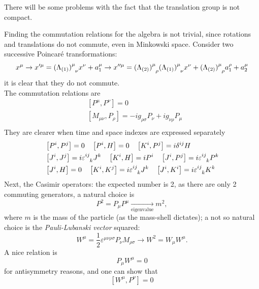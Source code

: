 There will be some problems with the fact that the translation group is not
compact.

Finding the commutation relations for the algebra is not trivial, since rotations
and translations do not commute, even in Minkowski space. Consider two
successive Poincaré transformations:
$$x^\mu\rightarrow x'^\mu={(\Lambda_{(1)})}\indices{^\mu_\nu}x^\nu+a_1^\mu\rightarrow
 x''^\mu={(\Lambda_{(2)})}\indices{^\mu_\rho}{(\Lambda_{(1)})}\indices{^\mu_\nu}
 x^\nu+ {(\Lambda_{(2)})}\indices{^\mu_\rho}a_1^\rho+a_2^\mu$$
it is clear that they do not commute.\\
The commutation relations are
\begin{align*}
&\left[P^\mu,P^\nu\right]=0\\
&\left[M_{\mu\nu},P_\rho\right] = -ig_{\rho\sigma}P_\nu+ig_{\nu\rho}P_\mu\\
\end{align*}
They are clearer when time and space indexes are expressed separately
\begin{align*}
&\left[P^i,P^j\right]=0\quad
\left[P^i,H\right]=0\quad
\left[K^i,P^j\right]=i\delta^{ij}H\\
&\left[J^i,J^j\right]=i\varepsilon\indices{^i^j_k}J^k\quad
\left[K^i,H\right]=iP^i\quad
\left[J^i,P^j\right]=i\varepsilon\indices{^i^j_k}P^k\\
&\left[J^i,H\right]=0\quad
\left[K^i,K^j\right]=i\varepsilon\indices{^i^j_k}J^k\quad
\left[J^i,K^i\right]=i\varepsilon\indices{^i^j_k}K^k
\end{align*}
Next, the Casimir operators: the expected number is 2, as there are only
2 commuting generators, a natural choice is
$$P^2 = P_\mu P^\mu\underset{\text{eigenvalue}}\longrightarrow m^2,$$
where $m$ is the mass of the particle (as the mass-shell dictates);
a not so natural choice is the \textit{Pauli-Lubanski vector} squared:
$$W^\mu = \frac{1}{2}\varepsilon^{\mu\nu\rho\sigma}P_\nu M_{\rho\sigma}\rightarrow
W^2 = W_\mu
W^\mu.$$
A nice relation is
$$P_\mu W^\mu = 0$$
for antisymmetry reasons, and one can show that
$$\left[W^\mu,P^\nu\right]=0$$
